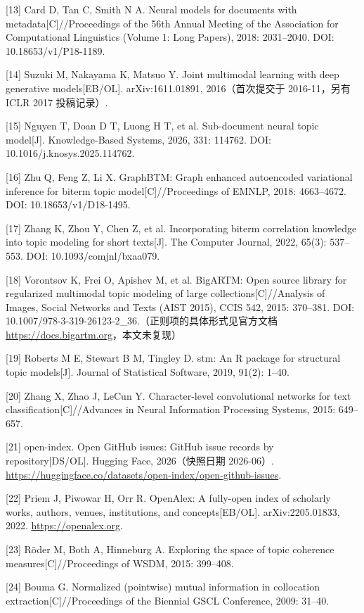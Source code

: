 \documentclass{article}
\begin{document}
[13] Card D, Tan C, Smith N A. Neural models for documents with metadata[C]//Proceedings of the 56th Annual Meeting of the Association for Computational Linguistics (Volume 1: Long Papers), 2018: 2031--2040. DOI: 10.18653/v1/P18-1189.

[14] Suzuki M, Nakayama K, Matsuo Y. Joint multimodal learning with deep generative models[EB/OL]. arXiv:1611.01891, 2016（首次提交于 2016-11，另有 ICLR 2017 投稿记录）.

[15] Nguyen T, Doan D T, Luong H T, et al. Sub-document neural topic model[J]. Knowledge-Based Systems, 2026, 331: 114762. DOI: 10.1016/j.knosys.2025.114762.

[16] Zhu Q, Feng Z, Li X. GraphBTM: Graph enhanced autoencoded variational inference for biterm topic model[C]//Proceedings of EMNLP, 2018: 4663--4672. DOI: 10.18653/v1/D18-1495.

[17] Zhang K, Zhou Y, Chen Z, et al. Incorporating biterm correlation knowledge into topic modeling for short texts[J]. The Computer Journal, 2022, 65(3): 537--553. DOI: 10.1093/comjnl/bxaa079.

[18] Vorontsov K, Frei O, Apishev M, et al. BigARTM: Open source library for regularized multimodal topic modeling of large collections[C]//Analysis of Images, Social Networks and Texts (AIST 2015), CCIS 542, 2015: 370--381. DOI: 10.1007/978-3-319-26123-2\_36.（正则项的具体形式见官方文档 \url{https://docs.bigartm.org}，本文未复现）

[19] Roberts M E, Stewart B M, Tingley D. stm: An R package for structural topic models[J]. Journal of Statistical Software, 2019, 91(2): 1--40.

[20] Zhang X, Zhao J, LeCun Y. Character-level convolutional networks for text classification[C]//Advances in Neural Information Processing Systems, 2015: 649--657.

[21] open-index. Open GitHub issues: GitHub issue records by repository[DS/OL]. Hugging Face, 2026（快照日期 2026-06）. \url{https://huggingface.co/datasets/open-index/open-github-issues}.

[22] Priem J, Piwowar H, Orr R. OpenAlex: A fully-open index of scholarly works, authors, venues, institutions, and concepts[EB/OL]. arXiv:2205.01833, 2022. \url{https://openalex.org}.

[23] R\"oder M, Both A, Hinneburg A. Exploring the space of topic coherence measures[C]//Proceedings of WSDM, 2015: 399--408.

[24] Bouma G. Normalized (pointwise) mutual information in collocation extraction[C]//Proceedings of the Biennial GSCL Conference, 2009: 31--40.
\end{document}
